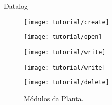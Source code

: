 \begin{frame}{Datalog}
   \begin{figure}[ht]
       \begin{minipage}[b]{0.3\linewidth}
         \centering
 \texttt{[image: tutorial/create]}
       \end{minipage}
       \begin{minipage}[b]{0.3\linewidth}
         \centering
 \texttt{[image: tutorial/open]}
\end{minipage}
       \begin{minipage}[b]{0.3\linewidth}
         \centering
	\texttt{[image: tutorial/write]}
       \end{minipage}
       \hspace{0.5cm}
       \begin{minipage}[b]{0.3\linewidth}
           \centering
	\texttt{[image: tutorial/write]}
       \end{minipage}
       \begin{minipage}[b]{0.3\linewidth}
           \centering
           \texttt{[image: tutorial/delete]}
       \end{minipage}
  \caption{Módulos da Planta.}
   \end{figure}
\end{frame}

